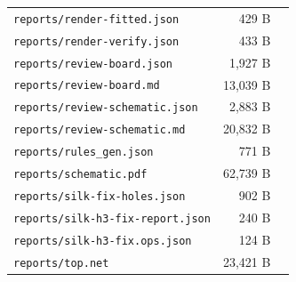 \documentclass[11pt,a4paper]{article}
\begin{document}
{\begin{longtable}{p{9cm}rp{4cm}}
\texttt{reports/render-fitted.json} & 429 B &  \\
\texttt{reports/render-verify.json} & 433 B &  \\
\texttt{reports/review-board.json} & 1,927 B &  \\
\texttt{reports/review-board.md} & 13,039 B &  \\
\texttt{reports/review-schematic.json} & 2,883 B &  \\
\texttt{reports/review-schematic.md} & 20,832 B &  \\
\texttt{reports/rules\_gen.json} & 771 B &  \\
\texttt{reports/schematic.pdf} & 62,739 B &  \\
\texttt{reports/silk-fix-holes.json} & 902 B &  \\
\texttt{reports/silk-h3-fix-report.json} & 240 B &  \\
\texttt{reports/silk-h3-fix.ops.json} & 124 B &  \\
\texttt{reports/top.net} & 23,421 B &  \\
\bottomrule
\end{longtable}
}
\end{document}

